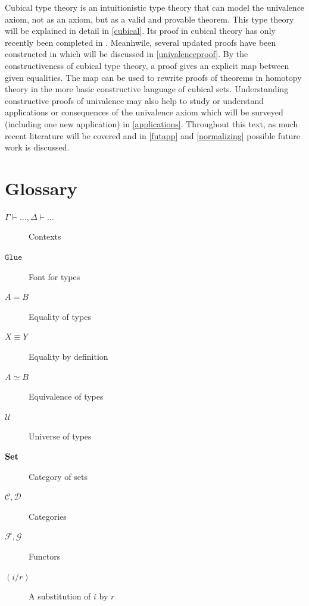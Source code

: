 \documentclass[12pt,a4paper,twoside,xetex]{book}
\newcommand{\op}[1]{\mathtt{#1}}
\begin{document}
Cubical type theory is an intuitionistic type theory that can model the univalence axiom, not as an axiom, but as a valid and provable theorem. This type theory will be explained in detail in \cref{cubical}. Its proof in cubical theory has only recently been completed in \cite{Cohen2016}. Meanhwile, several updated proofs have been constructed in \cite{Sterling2018b, Moertberg2018} which will be discussed in \cref{univalenceproof}. By the constructiveness of cubical type theory, a proof gives an explicit map between given equalities. The map can be used to rewrite proofs of theorems in homotopy theory in the more basic constructive language of cubical sets. Understanding constructive proofs of univalence may also help to study or understand applications or consequences of the univalence axiom which will be surveyed (including one new application) in \cref{applications}. Throughout this text, as much recent literature will be covered and in \cref{futapp} and \cref{normalizing} possible future work is discussed.

\chapter*{Glossary}


\begin{description}
\item[$\Gamma \vdash \ldots, \Delta \vdash \dots$] Contexts
\item[$\op{Glue}$] Font for types
\item[$A = B$] Equality of types
\item[$X \equiv Y$] Equality by definition
\item[$A \simeq B$] Equivalence of types
\item[$\mathcal{U}$] Universe of types
\item[$\text{\textbf{Set}}$] Category of sets
\item[$\mathcal{C}, \mathcal{D}$] Categories
\item[$\mathcal{F}, \mathcal{G}$] Functors
\item[$(i/r)$] A substitution of $i$ by $r$
\end{description}

\listoftodos[Notes]

\newpage

\tableofcontents


\newpage
\setcounter{page}{0}
\end{document}
